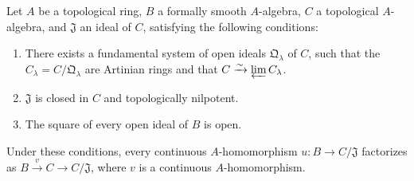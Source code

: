 \begin{proposition}[19.3.12]
\label{0.19.3.12}
Let $A$ be a topological ring, $B$ a formally smooth $A$-algebra, $C$ a topological $A$-algebra, and $\mathfrak{J}$ an ideal of $C$, satisfying the following conditions:
\begin{enumerate}
  \item[$1^\circ$] There exists a fundamental system of open ideals $\mathfrak{Q}_\lambda$ of $C$, such that the $C_\lambda=C/\mathfrak{Q}_\lambda$ are Artinian rings and that $C\xrightarrow{\sim}\varprojlim C_\lambda$.
  \item[$2^\circ$] $\mathfrak{J}$ is closed in $C$ and topologically nilpotent.
  \item[$3^\circ$] The square of every open ideal of $B$ is open.
\end{enumerate}
Under these conditions, every continuous $A$-homomorphism $u:B\to C/\mathfrak{J}$ factorizes as $B\xrightarrow{v}C\to C/\mathfrak{J}$, where $v$ is a continuous $A$-homomorphism.
\end{proposition}


